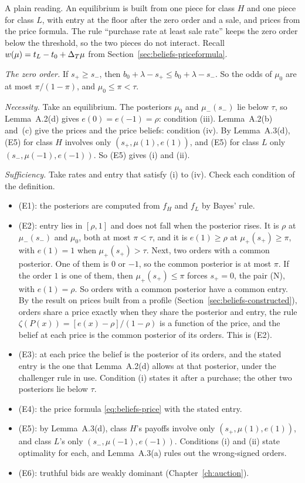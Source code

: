 A plain reading. An equilibrium is built from one piece for class \(H\) and one piece for class \(L\), with entry at
the floor after the zero order and a sale, and prices from the price formula. The rule ``purchase rate at least sale
rate'' keeps the zero order below the threshold, so the two pieces do not interact. Recall
\(w(\mu)=t_L-t_0+\Delta_T\mu\) from Section~\ref{sec:beliefs-priceformula}.

\begin{derivation}
\emph{The zero order.} If \(s_+\ge s_-\), then \(b_0+\lambda-s_+\le b_0+\lambda-s_-\). So the odds of \(\mu_0\) are
at most \(\pi/(1-\pi)\), and \(\mu_0\le\pi<\tau\).

\emph{Necessity.} Take an equilibrium. The posteriors \(\mu_0\) and \(\mu_-(s_-)\) lie below \(\tau\), so
Lemma~A.2(d) gives \(e(0)=e(-1)=\rho\): condition (iii). Lemma~A.2(b) and~(c) give the prices and the price beliefs:
condition (iv). By Lemma~A.3(d), (E5) for class \(H\) involves only \((s_+,\mu(1),e(1))\), and (E5) for class \(L\)
only \((s_-,\mu(-1),e(-1))\). So (E5) gives (i) and (ii).

\emph{Sufficiency.} Take rates and entry that satisfy (i) to (iv). Check each condition of the definition.
\begin{itemize}
\item (E1): the posteriors are computed from \(f_H\) and \(f_L\) by Bayes' rule.
\item (E2): entry lies in \([\rho,1]\) and does not fall when the posterior rises. It is \(\rho\) at \(\mu_-(s_-)\) and
\(\mu_0\), both at most \(\pi<\tau\), and it is \(e(1)\ge\rho\) at \(\mu_+(s_+)\ge\pi\), with \(e(1)=1\) when
\(\mu_+(s_+)>\tau\). Next, two orders with a common posterior. One of them is \(0\) or \(-1\), so the common
posterior is at most \(\pi\). If the order \(1\) is one of them, then \(\mu_+(s_+)\le\pi\) forces \(s_+=0\), the
pair (N), with \(e(1)=\rho\). So orders with a common posterior have a common entry. By the result on prices built
from a profile (Section~\ref{sec:beliefs-constructed}), orders share a price exactly when they share the posterior
and entry, the rule \(\zeta(P(x))=[e(x)-\rho]/(1-\rho)\) is a function of the price, and the belief at each price
is the common posterior of its orders. This is (E2).
\item (E3): at each price the belief is the posterior of its orders, and the stated entry is the one that
Lemma~A.2(d) allows at that posterior, under the challenger rule in use. Condition (i) states it after a purchase;
the other two posteriors lie below \(\tau\).
\item (E4): the price formula \eqref{eq:beliefs-price} with the stated entry.
\item (E5): by Lemma~A.3(d), class \(H\)'s payoffs involve only \((s_+,\mu(1),e(1))\), and class \(L\)'s only
\((s_-,\mu(-1),e(-1))\). Conditions (i) and (ii) state optimality for each, and Lemma~A.3(a) rules out the
wrong-signed orders.
\item (E6): truthful bids are weakly dominant (Chapter~\ref{ch:auction}).
\end{itemize}
\end{derivation}

